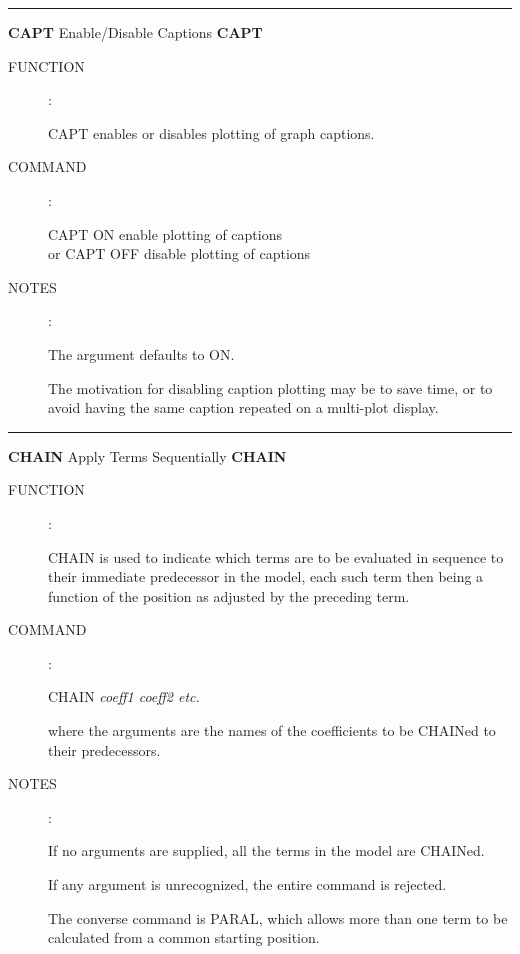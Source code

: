 \goodbreak
\rule{\textwidth}{0.3mm}
{\Large {\bf CAPT} \hfill Enable/Disable Captions \hfill {\bf CAPT}}
\begin{description}
\item [FUNCTION]:

CAPT enables or disables plotting of graph
captions.

\item [COMMAND]:

\begin{cmd}
\> \> CAPT ON \> enable plotting of captions \\
\> or \> CAPT OFF \> disable plotting of captions
\end{cmd}

\item [NOTES]:

The argument defaults to ON.

The motivation for disabling caption plotting may
be to save time, or to avoid having the same caption repeated
on a multi-plot display.

\end{description}


\goodbreak
\rule{\textwidth}{0.3mm}
{\Large {\bf CHAIN} \hfill Apply Terms Sequentially \hfill {\bf CHAIN}}
\begin{description}
\item [FUNCTION]:

CHAIN is used to indicate which terms
are to be evaluated in sequence to their immediate predecessor in the
model, each such term then being a function of the position
as adjusted by the preceding term.

\item [COMMAND]:

\begin{cmd}
\> \> CHAIN {\it coeff1 coeff2 etc.}
\end{cmd}

where the arguments are the names of the coefficients to be
CHAINed to their predecessors.

\item [NOTES]:

If no arguments are supplied, all the terms in the model
are CHAINed.

If any argument is unrecognized, the entire command is
rejected.

The converse command is PARAL, which allows more than one
term to be calculated from a common starting position.

\end{description}


